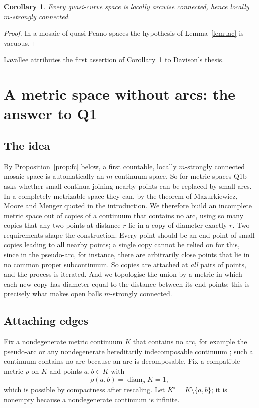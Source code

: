 \documentclass[11pt]{amsart}
\newtheorem{corollary}[theorem]{Corollary}
\theoremstyle{definition}
\theoremstyle{remark}
\newcommand{\diam}{\operatorname{diam}}
\numberwithin{equation}{section}
\begin{document}
\begin{corollary}\label{cor:qclac}
Every quasi-curve space is locally arcwise connected, hence locally $m$-strongly connected.
\end{corollary}
\begin{proof}
In a mosaic of quasi-Peano spaces the hypothesis of Lemma~\ref{lem:lac} is vacuous.
\end{proof}
\noindent Lavallee \cite[p.~1333]{lavallee64} attributes the first assertion of Corollary~\ref{cor:qclac} to Davison's thesis.

\section{A metric space without arcs: the answer to Q1}\label{sec:arcless}

\subsection{The idea}
By Proposition~\ref{prop:fc} below, a first countable, locally $m$-strongly connected mosaic space is automatically an $m$-continuum space. So for metric spaces Q1b asks whether small continua joining nearby points can be replaced by small arcs. In a completely metrizable space they can, by the theorem of Mazurkiewicz, Moore and Menger quoted in the introduction. We therefore build an incomplete metric space out of copies of a continuum that contains no arc, using so many copies that any two points at distance $r$ lie in a copy of diameter exactly $r$. Two requirements shape the construction. Every point should be an end point of small copies leading to all nearby points; a single copy cannot be relied on for this, since in the pseudo-arc, for instance, there are arbitrarily close points that lie in no common proper subcontinuum. So copies are attached at \emph{all} pairs of points, and the process is iterated. And we topologise the union by a metric in which each new copy has diameter equal to the distance between its end points; this is precisely what makes open balls $m$-strongly connected.

\subsection{Attaching edges}
Fix a nondegenerate metric continuum $K$ that contains no arc, for example the pseudo-arc or any nondegenerate hereditarily indecomposable continuum \cite{knaster22,moise48,bing48}; such a continuum contains no arc because an arc is decomposable. Fix a compatible metric $\rho$ on $K$ and points $a,b\in K$ with
\[\rho(a,b)=\diam_\rho K=1,\]
which is possible by compactness after rescaling. Let $K^\circ=K\setminus\{a,b\}$; it is nonempty because a nondegenerate continuum is infinite.
\end{document}
